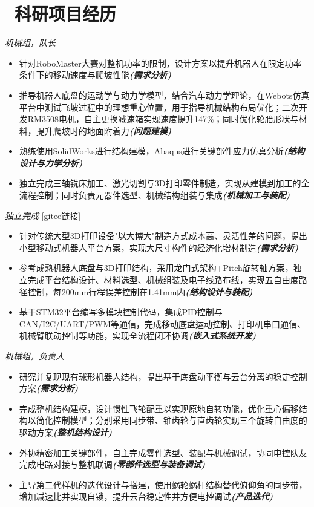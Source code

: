\documentclass{resume}
\begin{document}
\section{\research\  科研项目经历}
\textit{机械组，队长}
\begin{itemize}
  \item 针对RoboMaster大赛对整机功率的限制，设计方案以提升机器人在限定功率条件下的移动速度与爬坡性能\textit{\textbf{(需求分析)}}
  \item 推导机器人底盘的运动学与动力学模型，结合汽车动力学理论，在Webots仿真平台中测试飞坡过程中的理想重心位置，用于指导机械结构布局优化；二次开发RM3508电机，自主更换减速箱实现速度提升147\%；同时优化轮胎形状与材料，提升爬坡时的地面附着力\textit{\textbf{(问题建模)}}
  \item 熟练使用SolidWorks进行结构建模，Abaqus进行关键部件应力仿真分析\textit{\textbf{(结构设计与力学分析)}}
  \item 独立完成三轴铣床加工、激光切割与3D打印零件制造，实现从建模到加工的全流程控制；同时负责元器件选型、机械结构组装与集成\textit{\textbf{(机械加工与装配)}}
\end{itemize}

\textit{独立完成} \href{https://gitee.com/jcXue/mam_-robot.git}{[gitee链接]}
\begin{itemize}
  \item 针对传统大型3D打印设备"以大博大"制造方式成本高、灵活性差的问题，提出小型移动式机器人平台方案，实现大尺寸构件的经济化增材制造\textit{\textbf{(需求分析)}}
  \item 参考成熟机器人底盘与3D打印结构，采用龙门式架构+Pitch旋转轴方案，独立完成平台结构设计、材料选型、机械组装及电子线路布线，实现五自由度路径控制，每200mm行程误差控制在1.41mm内\textit{\textbf{(结构设计与装配)}}
  \item 基于STM32平台编写多模块控制代码，集成PID控制与CAN/I2C/UART/PWM等通信，完成移动底盘运动控制、打印机串口通信、机械臂联动控制等功能，实现全流程闭环协调\textit{\textbf{(嵌入式系统开发)}}
\end{itemize}

\textit{机械组，负责人}
\begin{itemize}
  \item 研究并复现现有球形机器人结构，提出基于底盘动平衡与云台分离的稳定控制方案\textit{\textbf{(需求分析)}}
  \item 完成整机结构建模，设计惯性飞轮配重以实现原地自转功能，优化重心偏移结构以简化控制模型；分别采用同步带、锥齿轮与直齿轮实现三个旋转自由度的驱动方案\textit{\textbf{(整机结构设计)}}
  \item 外协精密加工关键部件，自主完成零件选型、装配与机械调试，协同电控队友完成电路对接与整机联调\textit{\textbf{(零部件选型与装备调试)}}
  \item 主导第二代样机的迭代设计与搭建，使用蜗轮蜗杆结构替代俯仰角的同步带，增加减速比并实现自锁，提升云台稳定性并方便电控调试\textit{\textbf{(产品迭代)}}
\end{itemize}
\end{document}
